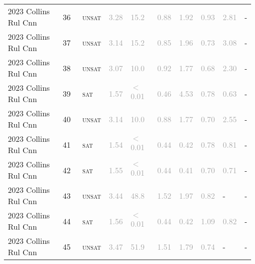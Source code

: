 \begin{center}
{\begin{longtable}{@{}llllllllll@{}}
2023 Collins Rul Cnn & 36 & ~\textsc{unsat} & \textcolor{darkgray}{3.28} & \textcolor{darkgray}{15.2} & \textcolor{darkgray}{0.88} & \textcolor{darkgray}{1.92} & \textcolor{darkgray}{0.93} & \textcolor{darkgray}{2.81} & - \\
2023 Collins Rul Cnn & 37 & ~\textsc{unsat} & \textcolor{darkgray}{3.14} & \textcolor{darkgray}{15.2} & \textcolor{darkgray}{0.85} & \textcolor{darkgray}{1.96} & \textcolor{darkgray}{0.73} & \textcolor{darkgray}{3.08} & - \\
2023 Collins Rul Cnn & 38 & ~\textsc{unsat} & \textcolor{darkgray}{3.07} & \textcolor{darkgray}{10.0} & \textcolor{darkgray}{0.92} & \textcolor{darkgray}{1.77} & \textcolor{darkgray}{0.68} & \textcolor{darkgray}{2.30} & - \\
2023 Collins Rul Cnn & 39 & ~\textsc{sat} & \textcolor{darkgray}{1.57} & \textcolor{darkgray}{$<$0.01} & \textcolor{darkgray}{0.46} & \textcolor{darkgray}{4.53} & \textcolor{darkgray}{0.78} & \textcolor{darkgray}{0.63} & - \\
2023 Collins Rul Cnn & 40 & ~\textsc{unsat} & \textcolor{darkgray}{3.14} & \textcolor{darkgray}{10.0} & \textcolor{darkgray}{0.88} & \textcolor{darkgray}{1.77} & \textcolor{darkgray}{0.70} & \textcolor{darkgray}{2.55} & - \\
2023 Collins Rul Cnn & 41 & ~\textsc{sat} & \textcolor{darkgray}{1.54} & \textcolor{darkgray}{$<$0.01} & \textcolor{darkgray}{0.44} & \textcolor{darkgray}{0.42} & \textcolor{darkgray}{0.78} & \textcolor{darkgray}{0.81} & - \\
2023 Collins Rul Cnn & 42 & ~\textsc{sat} & \textcolor{darkgray}{1.55} & \textcolor{darkgray}{$<$0.01} & \textcolor{darkgray}{0.44} & \textcolor{darkgray}{0.41} & \textcolor{darkgray}{0.70} & \textcolor{darkgray}{0.71} & - \\
2023 Collins Rul Cnn & 43 & ~\textsc{unsat} & \textcolor{darkgray}{3.44} & \textcolor{darkgray}{48.8} & \textcolor{darkgray}{1.52} & \textcolor{darkgray}{1.97} & \textcolor{darkgray}{0.82} & - & - \\
2023 Collins Rul Cnn & 44 & ~\textsc{sat} & \textcolor{darkgray}{1.56} & \textcolor{darkgray}{$<$0.01} & \textcolor{darkgray}{0.44} & \textcolor{darkgray}{0.42} & \textcolor{darkgray}{1.09} & \textcolor{darkgray}{0.82} & - \\
2023 Collins Rul Cnn & 45 & ~\textsc{unsat} & \textcolor{darkgray}{3.47} & \textcolor{darkgray}{51.9} & \textcolor{darkgray}{1.51} & \textcolor{darkgray}{1.79} & \textcolor{darkgray}{0.74} & - & - \\

\end{longtable}}
\end{center}

